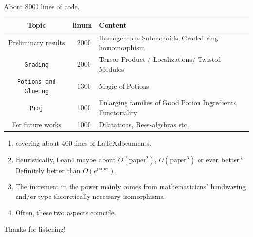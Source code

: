 \documentclass[9pt]{beamer}
\begin{document}
\begin{frame}[fragile]
  About 8000 lines of code.
    \begin{tabular}{c|c|p{}}
      Topic & linum & Content \\ \hline
      Preliminary results & ~2000 & Homogeneous Submonoids, Graded ring-homomorphism \\\hline
      \texttt{Grading} & ~2000 & Tensor Product / Localizations/ Twisted Modules \\\hline
      \texttt{Potions and Glueing} &  ~1300 &  Magic of Potions \\\hline
      \texttt{Proj} & ~1000 & Enlarging families of Good Potion Ingredients, Functoriality \\\hline
      For future works & ~1000 & Dilatations, Rees-algebras etc.
    \end{tabular}
  \begin{enumerate}
    \item<2-> covering about 400 lines of \LaTeX documents.
    \item<3-> Heuristically, $\text{Lean4}$ maybe about $O(\text{paper}^2)$, $O(\text{paper}^3)$ or even better? 
      Definitely better than $O\left(e^{\text{paper}}\right)$.
    \item<4-> The increment in the power mainly comes from mathematicians' handwaving and/or type theoretically necessary isomorphisms.
    \item<5-> Often, these two aspects coincide.
  \end{enumerate}
\end{frame}

\begin{frame}
\begin{center}
Thanks for listening!
\end{center}
\end{frame}
\end{document}
